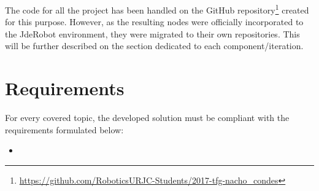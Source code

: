 The code for all the project has been handled on the GitHub repository\footnote{\url{https://github.com/RoboticsURJC-Students/2017-tfg-nacho\_condes}} created for this purpose. However, as the resulting nodes were officially incorporated to the JdeRobot environment, they were migrated to their own repositories. This will be further described on the section dedicated to each component/iteration.\\


\section{Requirements}

For every covered topic, the developed solution must be compliant with the requirements formulated below:

\begin{itemize}
	\item 
\end{itemize}
